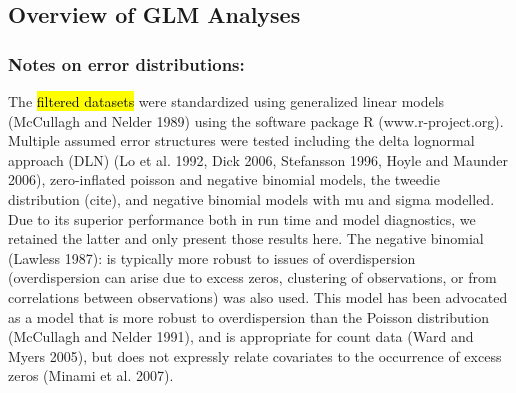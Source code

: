 

\subsection{Overview of GLM Analyses}
\subsubsection{Notes on error distributions:} 

The \hl{ filtered datasets} were standardized using generalized linear models (McCullagh and Nelder 1989) using the software package R (www.r-project.org). Multiple assumed error structures were tested including the delta lognormal approach (DLN) (Lo et al. 1992, Dick 2006, Stefansson 1996, Hoyle and Maunder 2006), zero-inflated poisson and negative binomial models, the tweedie distribution (cite), and negative binomial models with mu and sigma modelled. Due to its superior performance both in run time and model diagnostics, we retained the latter and only present those results here.
	   The negative binomial (Lawless 1987): is typically more robust to issues of overdispersion (overdispersion can arise due to excess zeros, clustering of observations, or from correlations between observations) was also used. This model has been advocated as a model that is more robust to overdispersion than the Poisson distribution (McCullagh and Nelder 1991), and is appropriate for count data (Ward and Myers  2005), but does not expressly relate covariates to the occurrence of excess zeros (Minami et al. 2007).


